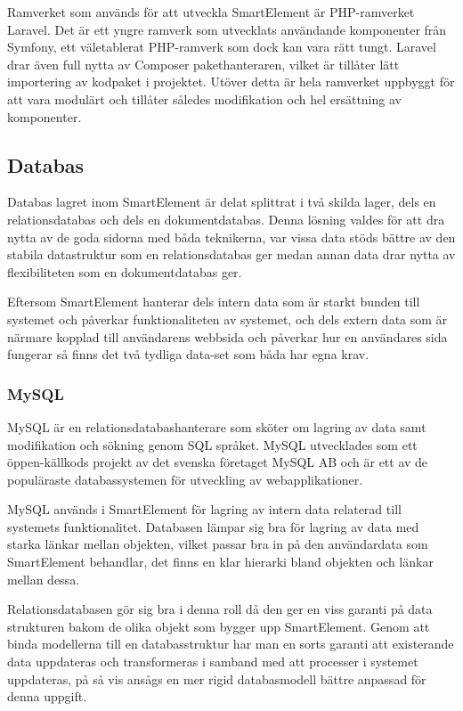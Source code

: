 Ramverket som används för att utveckla SmartElement är PHP-ramverket Laravel. Det är ett yngre ramverk som utvecklats användande komponenter från Symfony, ett väletablerat PHP-ramverk som dock kan vara rätt tungt. Laravel drar även full nytta av Composer pakethanteraren, vilket är tillåter lätt importering av kodpaket i projektet. Utöver detta är hela ramverket uppbyggt för att vara modulärt och tillåter således modifikation och hel ersättning av komponenter.

\subsection{Databas}

Databas lagret inom SmartElement är delat splittrat i två skilda lager, dels en relationsdatabas och dels en dokumentdatabas. Denna lösning valdes för att dra nytta av de goda sidorna med båda teknikerna, var vissa data stöds bättre av den stabila datastruktur som en relationsdatabas ger medan annan data drar nytta av flexibiliteten som en dokumentdatabas ger.

Eftersom SmartElement hanterar dels intern data som är starkt bunden till systemet och påverkar funktionaliteten av systemet, och dels extern data som är närmare kopplad till användarens webbsida och påverkar hur en användares sida fungerar så finns det två tydliga data-set som båda har egna krav.

\subsubsection{MySQL}

MySQL är en relationsdatabashanterare som sköter om lagring av data samt modifikation och sökning genom SQL språket. MySQL utvecklades som ett öppen-källkods projekt av det svenska företaget MySQL AB och är ett av de populäraste databassystemen för utveckling av webapplikationer. \citep{dbengines}

MySQL används i SmartElement för lagring av intern data relaterad till systemets funktionalitet. Databasen lämpar sig bra för lagring av data med starka länkar mellan objekten, vilket passar bra in på den användardata som SmartElement behandlar, det finns en klar hierarki bland objekten och länkar mellan dessa.

Relationsdatabasen gör sig bra i denna roll då den ger en viss garanti på data strukturen bakom de olika objekt som bygger upp SmartElement. Genom att binda modellerna till en databasstruktur har man en sorts garanti att existerande data uppdateras och transformeras i samband med att processer i systemet uppdateras, på så vis ansågs en mer rigid databasmodell bättre anpassad för denna uppgift.

